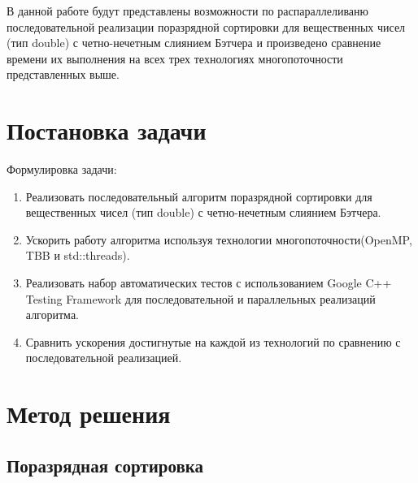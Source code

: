 \documentclass{article}
\begin{document}
\par В данной работе будут представлены возможности по распараллеливаню последовательной реализации поразрядной сортировки для вещественных чисел (тип double) с четно-нечетным слиянием Бэтчера и произведено сравнение времени их выполнения на всех трех технологиях многопоточности представленных выше.

\newpage

\section{Постановка задачи}
Формулировка задачи:

\begin{enumerate}
\item Реализовать последовательный алгоритм поразрядной сортировки для вещественных чисел (тип double) с четно-нечетным слиянием Бэтчера.
\item Ускорить работу алгоритма используя технологии многопоточности(OpenMP, TBB и std::threads).
\item Реализовать набор автоматических тестов с использованием Google C++ Testing Framework для последовательной и параллельных реализаций алгоритма.
\item Сравнить ускорения достигнутые на каждой из технологий по сравнению с последовательной реализацией.
\end{enumerate}

\newpage

\section{Метод решения}
\subsection{Поразрядная сортировка}
\end{document}
